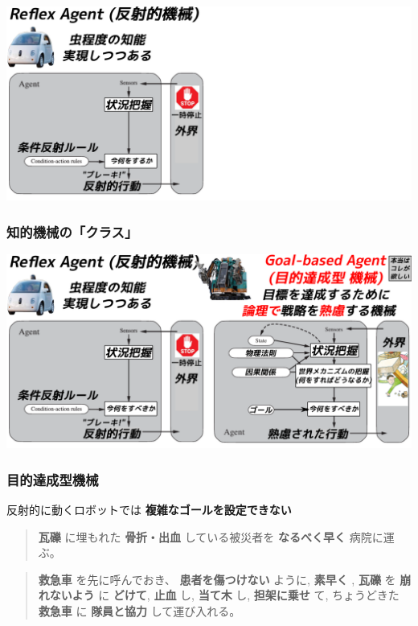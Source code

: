 \includegraphics{img/machines/1.png}

\subsubsection{知的機械の「クラス」}
\label{sec:orgheadline12}

\includegraphics{img/machines/2.png}

\subsubsection{目的達成型機械}
\label{sec:orgheadline13}

反射的に動くロボットでは \textbf{複雑なゴールを設定できない}

\begin{quote}
\textbf{瓦礫} に埋もれた \textbf{骨折・出血} している被災者を \textbf{なるべく早く} 病院に運ぶ。
\end{quote}
\begin{quote}
\textbf{救急車} を先に呼んでおき、 \textbf{患者を傷つけない} ように, \textbf{素早く} , \textbf{瓦礫} を \textbf{崩
れないよう} に \textbf{どけて}, \textbf{止血} し, \textbf{当て木} し, \textbf{担架に乗せ} て, ちょうどきた
\textbf{救急車} に \textbf{隊員と協力} して運び入れる。
\end{quote}

